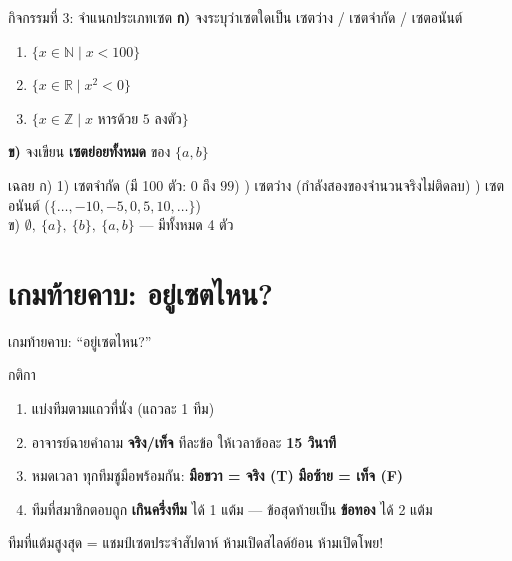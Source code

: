 \begin{frame}{กิจกรรมที่ 3: จำแนกประเภทเซต }
  \textbf{ก)} จงระบุว่าเซตใดเป็น เซตว่าง / เซตจำกัด / เซตอนันต์
  \begin{enumerate}
    \item $\{x \in \mathbb{N} \mid x < 100\}$
    \item $\{x \in \mathbb{R} \mid x^2 < 0\}$
    \item $\{x \in \mathbb{Z} \mid x \text{ หารด้วย 5 ลงตัว}\}$
  \end{enumerate}
  \textbf{ข)} จงเขียน \textbf{เซตย่อยทั้งหมด} ของ $\{a, b\}$
  \pause
  \begin{exampleblock}{เฉลย}
    \footnotesize
    ก) 1) เซตจำกัด (มี 100 ตัว: $0$ ถึง $99$) ) เซตว่าง (กำลังสองของจำนวนจริงไม่ติดลบ) ) เซตอนันต์ ($\{\ldots, -10, -5, 0, 5, 10, \ldots\}$) \\[0.3em]
    ข) $\emptyset,\ \{a\},\ \{b\},\ \{a, b\}$ --- มีทั้งหมด 4 ตัว
  \end{exampleblock}
\end{frame}


\section{เกมท้ายคาบ: อยู่เซตไหน?}

\begin{frame}{เกมท้ายคาบ: ``อยู่เซตไหน?'' }
  \begin{block}{กติกา}
    \begin{enumerate}
      \item แบ่งทีมตามแถวที่นั่ง (แถวละ 1 ทีม)
      \item อาจารย์ฉายคำถาม \textbf{จริง/เท็จ} ทีละข้อ ให้เวลาข้อละ \textbf{15 วินาที}
      \item หมดเวลา ทุกทีมชูมือพร้อมกัน: \textcolor{Tgreen}{\textbf{มือขวา = จริง (T)}} \quad
            \textcolor{Fred}{\textbf{มือซ้าย = เท็จ (F)}}
      \item ทีมที่สมาชิกตอบถูก \textbf{เกินครึ่งทีม} ได้ 1 แต้ม --- ข้อสุดท้ายเป็น \textbf{ข้อทอง} ได้ 2 แต้ม
    \end{enumerate}
  \end{block}
  \vspace{0.4em}
  \begin{exampleblock}{}
    \centering ทีมที่แต้มสูงสุด = แชมป์เซตประจำสัปดาห์ \quad ห้ามเปิดสไลด์ย้อน ห้ามเปิดโพย!
  \end{exampleblock}
\end{frame}

